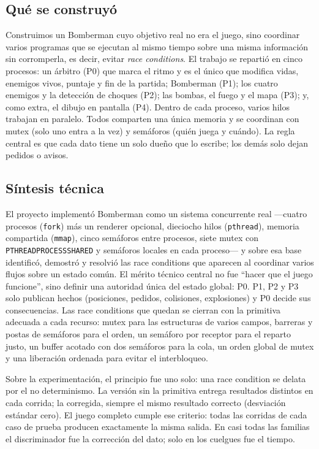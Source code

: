 \documentclass[11pt,a4paper]{article}
\newcommand{\cod}[1]{\texttt{#1}}
\renewcommand{\_}{\textunderscore\allowbreak}
\begin{document}
\subsection{Qué se construyó}

Construimos un Bomberman cuyo objetivo real no era el juego, sino coordinar varios programas que se ejecutan al mismo tiempo sobre una misma información sin corromperla, es decir, evitar \emph{race conditions}. El trabajo se repartió en cinco procesos: un árbitro (P0) que marca el ritmo y es el único que modifica vidas, enemigos vivos, puntaje y fin de la partida; Bomberman (P1); los cuatro enemigos y la detección de choques (P2); las bombas, el fuego y el mapa (P3); y, como extra, el dibujo en pantalla (P4). Dentro de cada proceso, varios hilos trabajan en paralelo. Todos comparten una única memoria y se coordinan con mutex (solo uno entra a la vez) y semáforos (quién juega y cuándo). La regla central es que cada dato tiene un solo dueño que lo escribe; los demás solo dejan pedidos o avisos.

\subsection{Síntesis técnica}

El proyecto implementó Bomberman como un sistema concurrente real ---cuatro procesos (\cod{fork}) más un renderer opcional, dieciocho hilos (\cod{pthread}), memoria compartida (\cod{mmap}), cinco semáforos entre procesos, siete mutex con \cod{PTHREAD\_PROCESS\_SHARED} y semáforos locales en cada proceso--- y sobre esa base identificó, demostró y resolvió las race conditions que aparecen al coordinar varios flujos sobre un estado común. El mérito técnico central no fue ``hacer que el juego funcione'', sino definir una autoridad única del estado global: P0. P1, P2 y P3 solo publican hechos (posiciones, pedidos, colisiones, explosiones) y P0 decide sus consecuencias. Las race conditions que quedan se cierran con la primitiva adecuada a cada recurso: mutex para las estructuras de varios campos, barreras y postas de semáforos para el orden, un semáforo por receptor para el reparto justo, un buffer acotado con dos semáforos para la cola, un orden global de mutex y una liberación ordenada para evitar el interbloqueo.

Sobre la experimentación, el principio fue uno solo: una race condition se delata por el no determinismo. La versión sin la primitiva entrega resultados distintos en cada corrida; la corregida, siempre el mismo resultado correcto (desviación estándar cero). El juego completo cumple ese criterio: todas las corridas de cada caso de prueba producen exactamente la misma salida. En casi todas las familias el discriminador fue la corrección del dato; solo en los cuelgues fue el tiempo.
\end{document}
